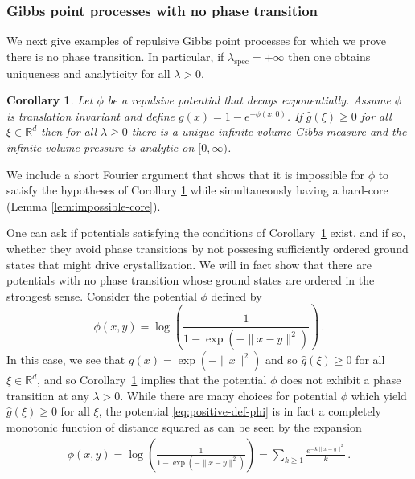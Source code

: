 \documentclass[10pt]{amsart}
\newtheorem{corollary}[theorem]{Corollary}
\theoremstyle{definition}
\theoremstyle{remark}
\newcommand{\spec}{{\mathrm{spec}}}
\newcommand{\R}{\mathbb{R}}
\begin{document}
	
	
	
	
	
	
	
	
	\subsubsection{Gibbs point processes with no phase transition}
	
	We next give examples of repulsive Gibbs point processes for which we prove there is no phase transition.  In particular, if $\lambda_{\spec} = +\infty$ then one obtains uniqueness and analyticity for all $\lambda > 0$.
	
	\begin{corollary}\label{cor:positive-definite}
		Let $\phi$ be a repulsive potential that decays exponentially.  Assume $\phi$ is translation invariant and define $g(x) = 1- e^{-\phi(x,0)}$.  If $\widehat{g}(\xi) \geq 0$ for all $\xi \in \R^d$ then for all $\lambda \geq 0$ there is a unique infinite volume Gibbs measure and the infinite volume pressure is analytic on $[0,\infty)$.
	\end{corollary} 
	
	
	We include a short Fourier argument  that shows that it is impossible for $\phi$ to  satisfy the hypotheses of Corollary \ref{cor:positive-definite} while simultaneously having a hard-core (Lemma \ref{lem:impossible-core}).
	
	
	
	{One can ask if potentials satisfying the conditions of Corollary~\ref{cor:positive-definite} exist, and if so, whether they avoid phase transitions by not possesing sufficiently ordered ground states that might drive crystallization.  We will in fact show that there are potentials with no phase transition whose ground states are ordered in the strongest sense.}
	Consider the potential $\phi$ defined by \begin{equation} \label{eq:positive-def-phi}
		\phi(x,y) = \log\left(\frac{1}{1 - \exp(-\|x - y\|^2)}\right)\,.
	\end{equation}
	In this case, we see that $g(x) = \exp(-\|x \|^2)$ and so $\widehat{g}(\xi) \geq 0$ for all $\xi \in \R^d$, and so  Corollary~\ref{cor:positive-definite} implies that the potential $\phi$ does not exhibit a phase transition at any $\lambda > 0$.   While there are many choices for potential $\phi$ which yield $\widehat{g}(\xi) \geq 0$ for all $\xi$, the potential \eqref{eq:positive-def-phi} is in fact a completely monotonic function of distance squared as can be seen by the expansion \begin{align*}
		\phi(x,y) = \log\left(\frac{1}{1 - \exp(-\|x - y\|^2)}\right) = \sum_{k \geq 1} \frac{e^{-k\|x - y\|^2}}{k} \,.
	\end{align*}
	
\end{document}
